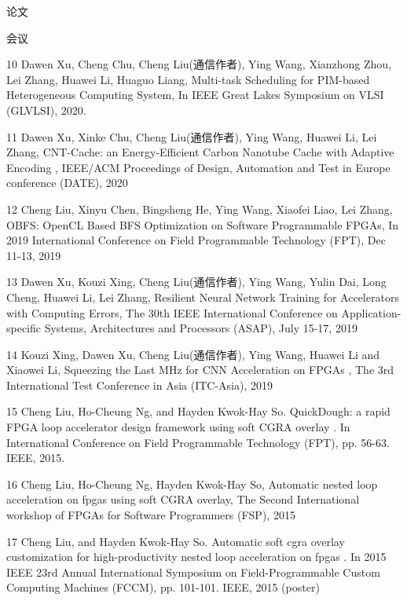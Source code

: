 \documentclass{resume} %
\begin{document}
\begin{rSection}{论文}
\begin{rSubsection} {会议}{}{}{}
    \item 10 Dawen Xu, Cheng Chu, Cheng Liu(通信作者), Ying Wang, Xianzhong Zhou, Lei Zhang, Huawei Li, Huaguo Liang, Multi-task Scheduling for PIM-based Heterogeneous Computing System, In IEEE Great Lakes Symposium on VLSI (GLVLSI), 2020.

    \item 11 Dawen Xu, Xinke Chu, Cheng Liu(通信作者), Ying Wang, Huawei Li, Lei Zhang, CNT-Cache: an Energy-Efficient Carbon Nanotube Cache with Adaptive Encoding , IEEE/ACM Proceedings of Design, Automation and Test in Europe conference (DATE), 2020

    \item 12 Cheng Liu, Xinyu Chen, Bingsheng He, Ying Wang, Xiaofei Liao, Lei Zhang, OBFS: OpenCL Based BFS Optimization on Software Programmable FPGAs, In 2019 International Conference on Field Programmable Technology (FPT), Dec 11-13, 2019

    \item 13 Dawen Xu, Kouzi Xing, Cheng Liu(通信作者), Ying Wang, Yulin Dai, Long Cheng, Huawei Li, Lei Zhang, Resilient Neural Network Training for Accelerators with Computing Errors, The 30th IEEE International Conference on Application-specific Systems, Architectures and Processors (ASAP), July 15-17, 2019

    \item 14 Kouzi Xing, Dawen Xu, Cheng Liu(通信作者), Ying Wang, Huawei Li and Xiaowei Li, Squeezing the Last MHz for CNN Acceleration on FPGAs , The 3rd International Test Conference in Asia (ITC-Asia), 2019

    \item 15 Cheng Liu, Ho-Cheung Ng, and Hayden Kwok-Hay So. QuickDough: a rapid FPGA loop accelerator design framework using soft CGRA overlay . In International Conference on Field Programmable Technology (FPT), pp. 56-63. IEEE, 2015.

    \item 16 Cheng Liu, Ho-Cheung Ng, Hayden Kwok-Hay So, Automatic nested loop acceleration on fpgas using soft CGRA overlay, The Second International workshop of FPGAs for Software Programmers (FSP), 2015

    \item 17 Cheng Liu, and Hayden Kwok-Hay So. Automatic soft cgra overlay customization for high-productivity nested loop acceleration on fpgas . In 2015 IEEE 23rd Annual International Symposium on Field-Programmable Custom Computing Machines (FCCM), pp. 101-101. IEEE, 2015 (poster)


\end{rSubsection}
\end{rSection}
\end{document}

